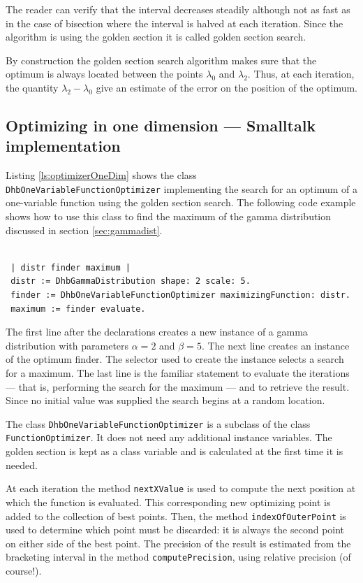 \documentclass[twoside]{book}
\begin{document}
The reader can verify that the interval decreases steadily
although not as fast as in the case of bisection where the
interval is halved at each iteration. Since the algorithm is using
the golden section it is called golden section search.

By construction the golden section search algorithm makes sure
that the optimum is always located between the points $\lambda_0$
and $\lambda_2$. Thus, at each iteration, the quantity
$\lambda_2-\lambda_0$ give an estimate of the error on the
position of the optimum.

\subsection{Optimizing in one dimension --- Smalltalk implementation}
 Listing
\ref{ls:optimizerOneDim} shows the class {\tt
DhbOneVariableFunctionOptimizer} implementing the search for an
optimum of a one-variable function using the golden section
search. The following code example shows how to use this class to
find the maximum of the gamma distribution discussed in section
\ref{sec:gammadist}.
\begin{codeExample}
\begin{verbatim}

 | distr finder maximum |
 distr := DhbGammaDistribution shape: 2 scale: 5.
 finder := DhbOneVariableFunctionOptimizer maximizingFunction: distr.
 maximum := finder evaluate.
\end{verbatim}
\end{codeExample}
The first line after the declarations creates a new instance of a
gamma distribution with parameters $\alpha = 2$ and $\beta = 5$.
The next line creates an instance of the optimum finder. The
selector used to create the instance selects a search for a
maximum. The last line is the familiar statement to evaluate the
iterations --- that is, performing the search for the maximum ---
and to retrieve the result. Since no initial value was supplied
the search begins at a random location.

The class {\tt DhbOneVariableFunctionOptimizer} is a subclass of
the class {\tt FunctionOptimizer}. It does not need any additional
instance variables. The golden section is kept as a class variable
and is calculated at the first time it is needed.

At each iteration the method {\tt nextXValue} is used to compute
the next position at which the function is evaluated. This
corresponding new optimizing point is added to the collection of
best points. Then, the method {\tt indexOfOuterPoint} is used to
determine which point must be discarded: it is always the second
point on either side of the best point. The precision of the
result is estimated from the bracketing interval in the method
{\tt computePrecision}, using relative precision (of course!).
\end{document}
